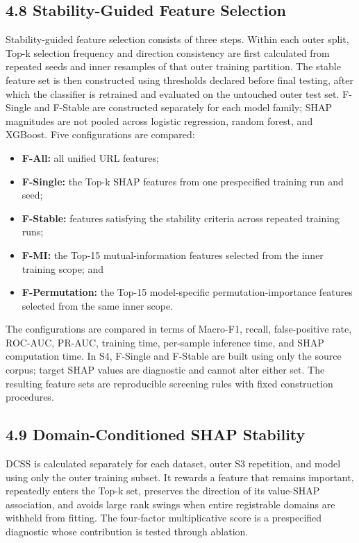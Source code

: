 \documentclass[
  10pt,
]{article}
\providecommand{\tightlist}{%
  \setlength{\itemsep}{0pt}\setlength{\parskip}{0pt}}
\begin{document}
\subsection{4.8 Stability-Guided Feature
Selection}\label{stability-guided-feature-selection}

Stability-guided feature selection consists of three steps. Within each
outer split, Top-k selection frequency and direction consistency are
first calculated from repeated seeds and inner resamples of that outer
training partition. The stable feature set is then constructed using
thresholds declared before final testing, after which the classifier is
retrained and evaluated on the untouched outer test set. F-Single and
F-Stable are constructed separately for each model family; SHAP
magnitudes are not pooled across logistic regression, random forest, and
XGBoost. Five configurations are compared:

\begin{itemize}
\tightlist
\item
  \textbf{F-All:} all unified URL features;
\item
  \textbf{F-Single:} the Top-k SHAP features from one prespecified
  training run and seed;
\item
  \textbf{F-Stable:} features satisfying the stability criteria across
  repeated training runs;
\item
  \textbf{F-MI:} the Top-15 mutual-information features selected from
  the inner training scope; and
\item
  \textbf{F-Permutation:} the Top-15 model-specific
  permutation-importance features selected from the same inner scope.
\end{itemize}

The configurations are compared in terms of Macro-F1, recall,
false-positive rate, ROC-AUC, PR-AUC, training time, per-sample
inference time, and SHAP computation time. In S4, F-Single and F-Stable
are built using only the source corpus; target SHAP values are
diagnostic and cannot alter either set. The resulting feature sets are
reproducible screening rules with fixed construction procedures.

\subsection{4.9 Domain-Conditioned SHAP
Stability}\label{domain-conditioned-shap-stability}

DCSS is calculated separately for each dataset, outer S3 repetition, and
model using only the outer training subset. It rewards a feature that
remains important, repeatedly enters the Top-k set, preserves the
direction of its value-SHAP association, and avoids large rank swings
when entire registrable domains are withheld from fitting. The
four-factor multiplicative score is a prespecified diagnostic whose
contribution is tested through ablation.
\end{document}
